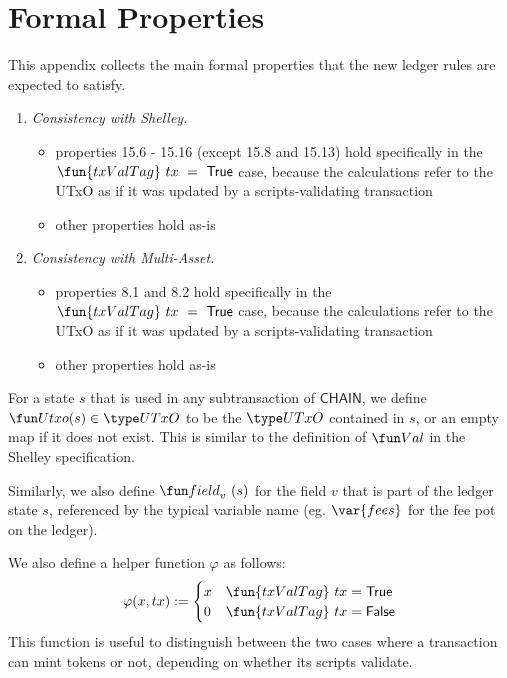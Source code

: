 \section{Formal Properties}
\label{sec:properties}

This appendix collects the main formal properties that the new ledger rules are expected to satisfy.

\begin{enumerate}[label=P{\arabic*}:\ ]
\item
  \emph{Consistency with Shelley.}
  \begin{itemize}
    \item properties 15.6 - 15.16 (except 15.8 and 15.13) hold specifically in the $\fun{txValTag}~tx~=~\True$ case, because
    the calculations refer to the UTxO as if it was updated by a scripts-validating transaction
    \item other properties hold as-is
  \end{itemize}

\item
  \emph{Consistency with Multi-Asset.}
  \begin{itemize}
    \item properties 8.1 and 8.2 hold specifically in the $\fun{txValTag}~tx~=~\True$ case, because
    the calculations refer to the UTxO as if it was updated by a scripts-validating transaction
    \item other properties hold as-is
  \end{itemize}
\end{enumerate}


\begin{definition}
  For a state $s$ that is used in any subtransaction of
  $\mathsf{CHAIN}$, we define $\Utxo(s) \in \UTxO$ to be the $\UTxO$
  contained in $s$, or an empty map if it does not exist. This is
  similar to the definition of $\Val$ in the Shelley specification.

  Similarly, we also define $\field_{v}~(s)$ for the field $v$ that is part of
  the ledger state $s$, referenced by the typical variable name (eg. $\var{fees}$
  for the fee pot on the ledger).
\end{definition}

We also define a helper function $\varphi$ as follows:
\[\varphi(x, tx) :=
  \begin{cases}
    x & \fun{txValTag}~tx = \True \\
    0 & \fun{txValTag}~tx = \False
  \end{cases}\]
This function is useful to distinguish between the two
cases where a transaction can mint tokens or not, depending on whether
its scripts validate.

